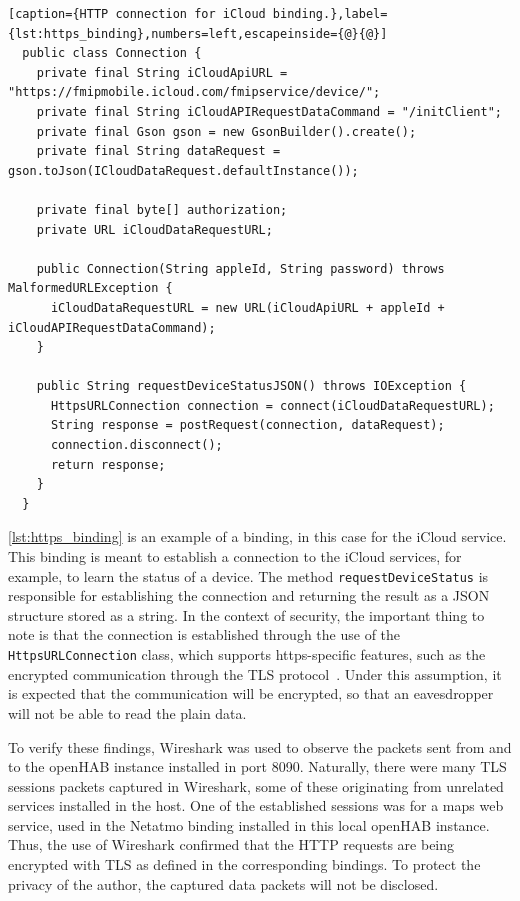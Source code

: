 \documentclass[12pt]{article}
\begin{document}
\newpage
\begin{lstlisting}[caption={HTTP connection for iCloud binding.},label={lst:https_binding},numbers=left,escapeinside={@}{@}]
  public class Connection {
    private final String iCloudApiURL = "https://fmipmobile.icloud.com/fmipservice/device/";
    private final String iCloudAPIRequestDataCommand = "/initClient";
    private final Gson gson = new GsonBuilder().create();
    private final String dataRequest = gson.toJson(ICloudDataRequest.defaultInstance());
    
    private final byte[] authorization;
    private URL iCloudDataRequestURL;
    
    public Connection(String appleId, String password) throws MalformedURLException {
      iCloudDataRequestURL = new URL(iCloudApiURL + appleId + iCloudAPIRequestDataCommand);
    } 
    
    public String requestDeviceStatusJSON() throws IOException {
      HttpsURLConnection connection = connect(iCloudDataRequestURL);
      String response = postRequest(connection, dataRequest);
      connection.disconnect();    
      return response;
    }
  }
\end{lstlisting}

\autoref{lst:https_binding} is an example of a binding, in this case for the iCloud service. This binding is meant to establish a connection to the iCloud services, for example, to learn the status of a device. The method \texttt{requestDeviceStatus} is responsible for establishing the connection and returning the result as a JSON structure stored as a string. In the context of security, the important thing to note is that the connection is established through the use of the \texttt{HttpsURLConnection} class, which supports https-specific features, such as the encrypted communication through the TLS protocol~\cite{java_01}. Under this assumption, it is expected that the communication will be encrypted, so that an eavesdropper will not be able to read the plain data.

To verify these findings, Wireshark was used to observe the packets sent from and to the openHAB instance installed in port 8090. Naturally, there were many TLS sessions packets captured in Wireshark, some of these originating from unrelated services installed in the host. One of the established sessions was for a maps web service, used in the Netatmo binding installed in this local openHAB instance. Thus, the use of Wireshark confirmed that the HTTP requests are being encrypted with TLS as defined in the corresponding bindings. To protect the privacy of the author, the captured data packets will not be disclosed. 
\end{document}
